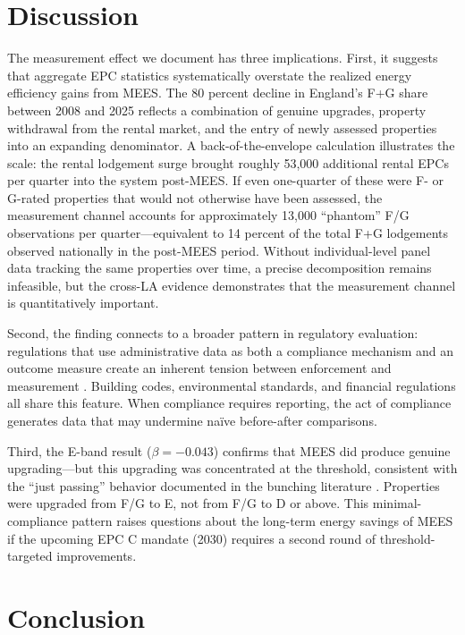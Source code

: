 \documentclass[12pt]{article}
\begin{document}
\section{Discussion}

The measurement effect we document has three implications. First, it suggests that aggregate EPC statistics systematically overstate the realized energy efficiency gains from MEES. The 80 percent decline in England's F+G share between 2008 and 2025 reflects a combination of genuine upgrades, property withdrawal from the rental market, and the entry of newly assessed properties into an expanding denominator. A back-of-the-envelope calculation illustrates the scale: the rental lodgement surge brought roughly 53,000 additional rental EPCs per quarter into the system post-MEES. If even one-quarter of these were F- or G-rated properties that would not otherwise have been assessed, the measurement channel accounts for approximately 13,000 ``phantom'' F/G observations per quarter---equivalent to 14 percent of the total F+G lodgements observed nationally in the post-MEES period. Without individual-level panel data tracking the same properties over time, a precise decomposition remains infeasible, but the cross-LA evidence demonstrates that the measurement channel is quantitatively important.

Second, the finding connects to a broader pattern in regulatory evaluation: regulations that use administrative data as both a compliance mechanism and an outcome measure create an inherent tension between enforcement and measurement \citep{houde2018consumer}. Building codes, environmental standards, and financial regulations all share this feature. When compliance requires reporting, the act of compliance generates data that may undermine na\"ive before-after comparisons.

Third, the E-band result ($\beta = -0.043$) confirms that MEES did produce genuine upgrading---but this upgrading was concentrated at the threshold, consistent with the ``just passing'' behavior documented in the bunching literature \citep{kleven2016bunching}. Properties were upgraded from F/G to E, not from F/G to D or above. This minimal-compliance pattern raises questions about the long-term energy savings of MEES if the upcoming EPC C mandate (2030) requires a second round of threshold-targeted improvements.

\section{Conclusion}
\end{document}
